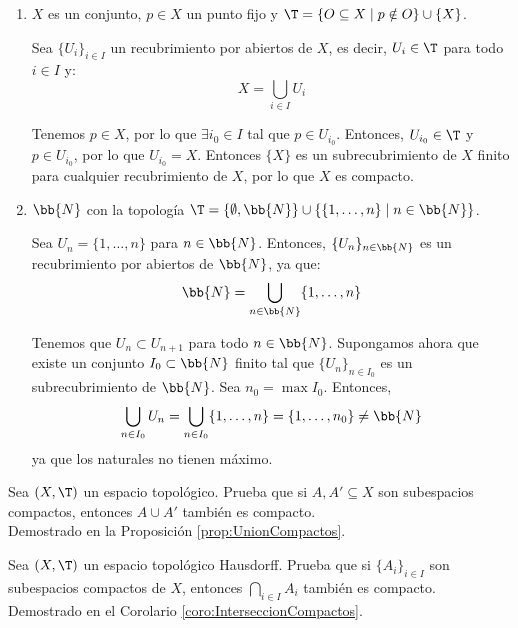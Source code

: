 \begin{ejercicio}
\begin{enumerate}
    \item $X $ es un conjunto, $ p \in X $ un punto fijo y $ \T = \{O \subseteq X \mid p \notin O\} \cup \{X\}$.
    
    Sea $\{U_i\}_{i\in I}$ un recubrimiento por abiertos de $X$, es decir, $U_i\in \T$ para todo $i\in I$ y:
    \begin{equation*}
        X = \bigcup_{i\in I} U_i
    \end{equation*}

    Tenemos $p\in X$, por lo que $\exists i_0\in I$ tal que $p\in U_{i_0}$. Entonces, $U_{i_0}\in \T$ y $p\in U_{i_0}$, por lo que $U_{i_0}=X$.
    Entonces $\{X\}$ es un subrecubrimiento de $X$ finito para cualquier recubrimiento de $X$, por lo que $X$ es compacto.

    \item $\bb{N} $ con la topología $ \T = \{\emptyset, \bb{N}\} \cup \{\{1, \ldots, n\} \mid n \in \bb{N}\} $.
    
    Sea $U_n=\{1,\ldots,n\}$ para $n\in \bb{N}$. Entonces, $\{U_n\}_{n\in \bb{N}}$ es un recubrimiento por abiertos de $\bb{N}$, ya que:
    \begin{equation*}
        \bb{N} = \bigcup_{n\in \bb{N}} \{1,\ldots,n\}
    \end{equation*}

    Tenemos que $U_n\subset U_{n+1}$ para todo $n\in \bb{N}$. Supongamos ahora que existe un conjunto $I_0\subset \bb{N}$ finito tal que $\{U_n\}_{n\in I_0}$ es un subrecubrimiento de $\bb{N}$.
    Sea $n_0=\max I_0$. Entonces,
    \begin{equation*}
        \bigcup_{n\in I_0} U_n = \bigcup_{n\in I_0} \{1,\ldots,n\} = \{1,\ldots,n_0\} \neq \bb{N}
    \end{equation*}
    ya que los naturales no tienen máximo.

\end{enumerate}
\end{ejercicio}

\begin{ejercicio}
    Sea $(X, \T)$ un espacio topológico. Prueba que si $ A, A' \subseteq X $ son subespacios compactos, entonces $ A \cup A' $ también es compacto.\\

    Demostrado en la Proposición \ref{prop:UnionCompactos}.
\end{ejercicio}


\begin{ejercicio}
    Sea $(X, \T)$ un espacio topológico Hausdorff. Prueba que si $\{A_i\}_{i \in I}$ son subespacios compactos de $X$, entonces $\bigcap\limits_{i \in I} A_i$ también es compacto.\\

    Demostrado en el Corolario \ref{coro:InterseccionCompactos}.
\end{ejercicio}

